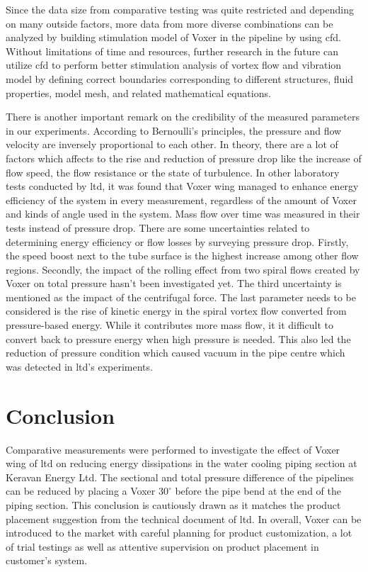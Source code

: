 Since the data size from comparative testing was quite restricted and depending on many outside factors, more data from more diverse combinations can be analyzed by building stimulation model of Voxer in the pipeline by using \gls{cfd}. Without limitations of time and resources, further research in the future can utilize \gls{cfd} to perform better stimulation analysis of vortex flow and vibration model by defining correct boundaries corresponding to different structures, fluid properties, model mesh, and related mathematical equations. 

There is another important remark on the credibility of the measured parameters in our experiments.  According to Bernoulli's principles, the pressure and flow velocity are inversely proportional to each other. In theory, there are a lot of factors which affects to the rise and reduction of pressure drop like the increase of flow speed, the flow resistance or the state of turbulence. In other laboratory tests conducted by \gls{ltd}, it was found that Voxer wing managed to enhance energy efficiency of the system in every measurement, regardless of the amount of Voxer and kinds of angle used in the system. Mass flow over time was measured in their tests instead of pressure drop. There are some uncertainties related to determining energy efficiency or flow losses by surveying pressure drop. Firstly, the speed boost next to the tube surface is the highest increase among other flow regions. Secondly, the impact of the rolling effect from two spiral flows created by Voxer on total pressure hasn't been investigated yet. The third uncertainty is mentioned as the impact of the centrifugal force. The last parameter needs to be considered is the rise of kinetic energy in the spiral vortex flow converted from pressure-based energy. While it contributes more mass flow, it it difficult to convert back to pressure energy when high pressure is needed. This also led the reduction of pressure condition which caused vacuum in the pipe centre which was detected in \gls{ltd}'s experiments.
\newpage

\section{Conclusion}

Comparative measurements were performed to investigate the effect of Voxer wing of \gls{ltd} on reducing energy dissipations in the water cooling piping section at Keravan Energy Ltd. The sectional and total pressure difference of the pipelines can be reduced by placing a Voxer $30^{\circ}$ before the pipe bend at the end of the piping section. This conclusion is cautiously drawn as it matches the product placement suggestion from the technical document of \gls{ltd}. In overall, Voxer can be introduced to the market with careful planning for product customization, a lot of trial testings as well as attentive supervision on product placement in customer's system. 

\clearpage %
